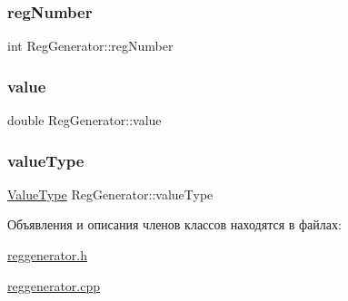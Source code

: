 \subsubsection{\texorpdfstring{reg\+Number}{regNumber}}
{\footnotesize\ttfamily int Reg\+Generator\+::reg\+Number}

\mbox{\label{class_reg_generator_ad557c58539b7d84e7667d0259d739000}} 
\subsubsection{\texorpdfstring{value}{value}}
{\footnotesize\ttfamily double Reg\+Generator\+::value}

\mbox{\label{class_reg_generator_aabe826a51b5b4917754f94264f601ea8}} 
\subsubsection{\texorpdfstring{value\+Type}{valueType}}
{\footnotesize\ttfamily \hyperlink{_random_types_8h_ad9971b6ef33e02ba2c75d19c1d2518a1}{Value\+Type} Reg\+Generator\+::value\+Type}



Объявления и описания членов классов находятся в файлах\+:\begin{DoxyCompactItemize}
\item 
\hyperlink{reggenerator_8h}{reggenerator.\+h}\item 
\hyperlink{reggenerator_8cpp}{reggenerator.\+cpp}\end{DoxyCompactItemize}
